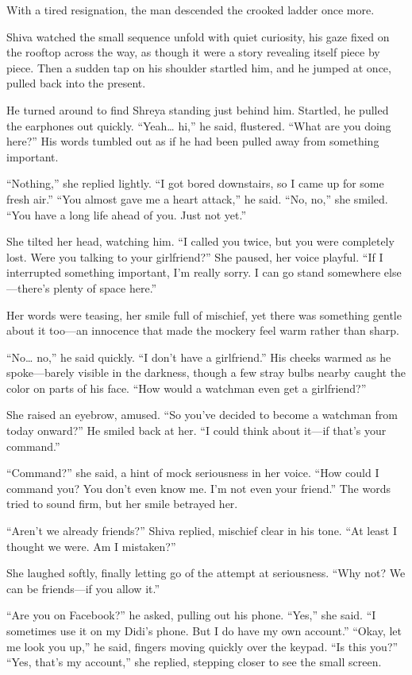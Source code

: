 With a tired resignation, the man descended the crooked ladder once more.

Shiva watched the small sequence unfold with quiet curiosity, his gaze fixed on the rooftop across the way, as though it were a story revealing itself piece by piece. Then a sudden tap on his shoulder startled him, and he jumped at once, pulled back into the present.

He turned around to find Shreya standing just behind him. Startled, he pulled the earphones out quickly.
``Yeah… hi,'' he said, flustered. ``What are you doing here?'' His words tumbled out as if he had been pulled away from something important.

``Nothing,'' she replied lightly. ``I got bored downstairs, so I came up for some fresh air.''
``You almost gave me a heart attack,'' he said.
``No, no,'' she smiled. ``You have a long life ahead of you. Just not yet.''

She tilted her head, watching him. ``I called you twice, but you were completely lost. Were you talking to your girlfriend?'' She paused, her voice playful. ``If I interrupted something important, I'm really sorry. I can go stand somewhere else—there's plenty of space here.''

Her words were teasing, her smile full of mischief, yet there was something gentle about it too—an innocence that made the mockery feel warm rather than sharp.

``No… no,'' he said quickly. ``I don't have a girlfriend.'' His cheeks warmed as he spoke—barely visible in the darkness, though a few stray bulbs nearby caught the color on parts of his face. ``How would a watchman even get a girlfriend?''

She raised an eyebrow, amused. ``So you've decided to become a watchman from today onward?''
He smiled back at her. ``I could think about it—if that's your command.''

``Command?'' she said, a hint of mock seriousness in her voice. ``How could I command you? You don't even know me. I'm not even your friend.'' The words tried to sound firm, but her smile betrayed her.

``Aren't we already friends?'' Shiva replied, mischief clear in his tone. ``At least I thought we were. Am I mistaken?''

She laughed softly, finally letting go of the attempt at seriousness. ``Why not? We can be friends—if you allow it.''

``Are you on Facebook?'' he asked, pulling out his phone.
``Yes,'' she said. ``I sometimes use it on my Didi's phone. But I do have my own account.''
``Okay, let me look you up,'' he said, fingers moving quickly over the keypad. ``Is this you?''
``Yes, that's my account,'' she replied, stepping closer to see the small screen.

